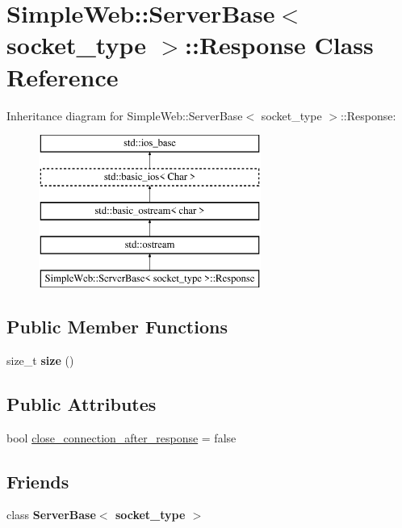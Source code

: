 \hypertarget{a01573}{}\section{Simple\+Web\+:\+:Server\+Base$<$ socket\+\_\+type $>$\+:\+:Response Class Reference}
\label{a01573}
Inheritance diagram for Simple\+Web\+:\+:Server\+Base$<$ socket\+\_\+type $>$\+:\+:Response\+:\begin{figure}[H]
\begin{center}
\leavevmode
\includegraphics[height=5.000000cm]{a01573}
\end{center}
\end{figure}
\subsection*{Public Member Functions}
\begin{DoxyCompactItemize}
\item 
\mbox{\label{a01573_af666efb61621d70c16e3d6a6c419271d}} 
size\+\_\+t {\bfseries size} ()
\end{DoxyCompactItemize}
\subsection*{Public Attributes}
\begin{DoxyCompactItemize}
\item 
bool \hyperlink{a01573_a2818b4f3c577ff1f4067bb1c62640c15}{close\+\_\+connection\+\_\+after\+\_\+response} = false
\end{DoxyCompactItemize}
\subsection*{Friends}
\begin{DoxyCompactItemize}
\item 
\mbox{\label{a01573_a01d54a7e16ca437c98ec571deca98dfc}} 
class {\bfseries Server\+Base$<$ socket\+\_\+type $>$}
\end{DoxyCompactItemize}


